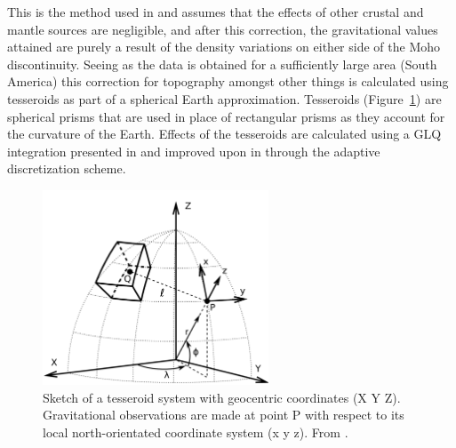 This is the method used in \cite{Uieda2016} and assumes that the effects of other crustal and mantle sources are negligible, and after this correction, the gravitational values attained are purely a result of the density variations on either side of the Moho discontinuity. Seeing as the data is obtained for a sufficiently large area (South America) this correction for topography amongst other things is calculated using tesseroids as part of a spherical Earth approximation. Tesseroids (Figure~\ref{fig:tesseroids}) are spherical prisms that are used in place of rectangular prisms as they account for the curvature of the Earth. Effects of the tesseroids are calculated using a GLQ integration presented in \cite{Asgharzadeh2007} and improved upon in \cite{Uieda2015} through the adaptive discretization scheme.
\begin{figure}[h]
  \begin{center}
    \includegraphics[width=0.6\textwidth]{figures/tesseroid-coord-sys}
  \end{center}
  \caption{
   Sketch of a tesseroid system with geocentric coordinates (X Y Z). Gravitational observations are made at point P with respect to its local north-orientated coordinate system (x y z). From \cite{Uieda2015}.
  }
  \label{fig:tesseroids}
\end{figure}
